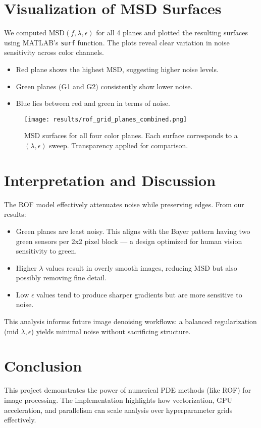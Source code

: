 \documentclass[11pt]{article}
\begin{document}
\section{Visualization of MSD Surfaces}
We computed \( \text{MSD}(f, \lambda, \epsilon) \) for all 4 planes and plotted the resulting surfaces using MATLAB's \texttt{surf} function. The plots reveal clear variation in noise sensitivity across color channels.
\begin{itemize}
    \item Red plane shows the highest MSD, suggesting higher noise levels.
    \item Green planes (G1 and G2) consistently show lower noise.
    \item Blue lies between red and green in terms of noise.
\end{itemize}

\begin{figure}[h]
\centering
\texttt{[image: results/rof\_grid\_planes\_combined.png]}
\caption{MSD surfaces for all four color planes. Each surface corresponds to a $(\lambda,\epsilon)$ sweep. Transparency applied for comparison.}
\end{figure}


\section{Interpretation and Discussion}
The ROF model effectively attenuates noise while preserving edges. From our results:

\begin{itemize}
  \item Green planes are least noisy. This aligns with the Bayer pattern having two green sensors per 2x2 pixel block — a design optimized for human vision sensitivity to green.
  \item Higher \(\lambda\) values result in overly smooth images, reducing MSD but also possibly removing fine detail.
  \item Low \(\epsilon\) values tend to produce sharper gradients but are more sensitive to noise.
\end{itemize}

This analysis informs future image denoising workflows: a balanced regularization (mid \(\lambda, \epsilon\)) yields minimal noise without sacrificing structure.

\section{Conclusion}
This project demonstrates the power of numerical PDE methods (like ROF) for image processing. The implementation highlights how vectorization, GPU acceleration, and parallelism can scale analysis over hyperparameter grids effectively.
\end{document}

